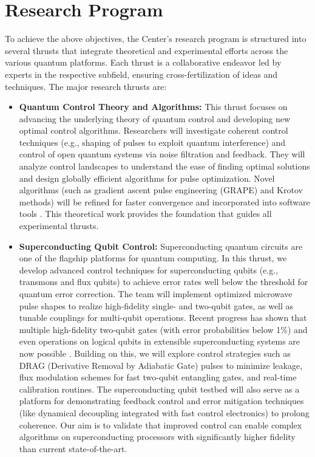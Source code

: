 \documentclass[11pt]{article}
\begin{document}
\section{Research Program}
To achieve the above objectives, the Center's research program is structured into several thrusts that integrate theoretical and experimental efforts across the various quantum platforms. Each thrust is a collaborative endeavor led by experts in the respective subfield, ensuring cross-fertilization of ideas and techniques. The major research thrusts are:
\begin{itemize}
   \item \textbf{Quantum Control Theory and Algorithms:} This thrust focuses on advancing the underlying theory of quantum control and developing new optimal control algorithms. Researchers will investigate coherent control techniques (e.g., shaping of pulses to exploit quantum interference) and control of open quantum systems via noise filtration and feedback. They will analyze control landscapes to understand the ease of finding optimal solutions \cite{Rabitz07} and design globally efficient algorithms for pulse optimization. Novel algorithms (such as gradient ascent pulse engineering (GRAPE) and Krotov methods) will be refined for faster convergence and incorporated into software tools \cite{Khaneja05}. This theoretical work provides the foundation that guides all experimental thrusts.
   \item \textbf{Superconducting Qubit Control:} Superconducting quantum circuits are one of the flagship platforms for quantum computing. In this thrust, we develop advanced control techniques for superconducting qubits (e.g., transmons and flux qubits) to achieve error rates well below the threshold for quantum error correction. The team will implement optimized microwave pulse shapes to realize high-fidelity single- and two-qubit gates, as well as tunable couplings for multi-qubit operations. Recent progress has shown that multiple high-fidelity two-qubit gates (with error probabilities below 1\%) and even operations on logical qubits in extensible superconducting systems are now possible \cite{Kjaergaard20}. Building on this, we will explore control strategies such as DRAG (Derivative Removal by Adiabatic Gate) pulses to minimize leakage, flux modulation schemes for fast two-qubit entangling gates, and real-time calibration routines. The superconducting qubit testbed will also serve as a platform for demonstrating feedback control and error mitigation techniques (like dynamical decoupling integrated with fast control electronics) to prolong coherence. Our aim is to validate that improved control can enable complex algorithms on superconducting processors with significantly higher fidelity than current state-of-the-art.

\end{itemize}
\end{document}
